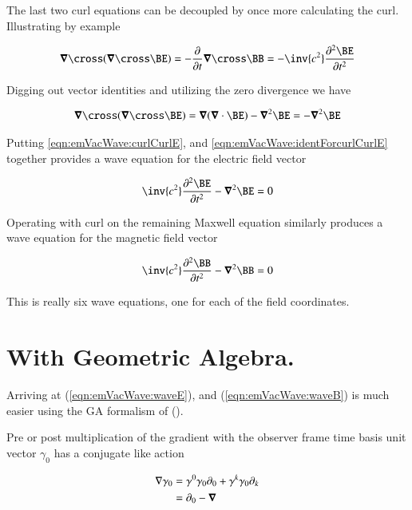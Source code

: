 The last two curl equations can be decoupled by once more calculating the curl.  Illustrating by example

\begin{align}\label{eqn:emVacWave:curlCurlE}
\spacegrad \cross (\spacegrad \cross \BE) = -\frac{\partial }{\partial t} \spacegrad \cross \BB = -\inv{c^2} \frac{\partial^2 \BE}{\partial t^2}
\end{align}

Digging out vector identities and utilizing the zero divergence we have

\begin{align}\label{eqn:emVacWave:identForcurlCurlE}
\spacegrad \cross (\spacegrad \cross \BE) = \spacegrad (\spacegrad \cdot \BE) - \spacegrad^2 \BE = -\spacegrad^2 \BE
\end{align}

Putting \ref{eqn:emVacWave:curlCurlE}, and \ref{eqn:emVacWave:identForcurlCurlE} together provides a wave equation for the electric field vector

\begin{align}\label{eqn:emVacWave:waveE}
\inv{c^2} \frac{\partial^2 \BE}{\partial t^2} - \spacegrad^2 \BE = 0
\end{align}

Operating with curl on the remaining Maxwell equation similarly produces a wave equation for the magnetic field vector

\begin{align}\label{eqn:emVacWave:waveB}
\inv{c^2} \frac{\partial^2 \BB}{\partial t^2} - \spacegrad^2 \BB = 0
\end{align}

This is really six wave equations, one for each of the field coordinates.

\section{With Geometric Algebra.}

Arriving at (\ref{eqn:emVacWave:waveE}), and (\ref{eqn:emVacWave:waveB}) is much easier using the GA formalism of (\cite{doran2003gap}).

Pre or post multiplication of the gradient with the observer frame time basis unit vector $\gamma_0$ has a conjugate like
action

\begin{align*}
\nabla \gamma_0
&=
\gamma^0 \gamma_0 \partial_0 + \gamma^k \gamma_0 \partial_k \\
&=
\partial_0 - \boldsymbol{\nabla} \\
\end{align*}

